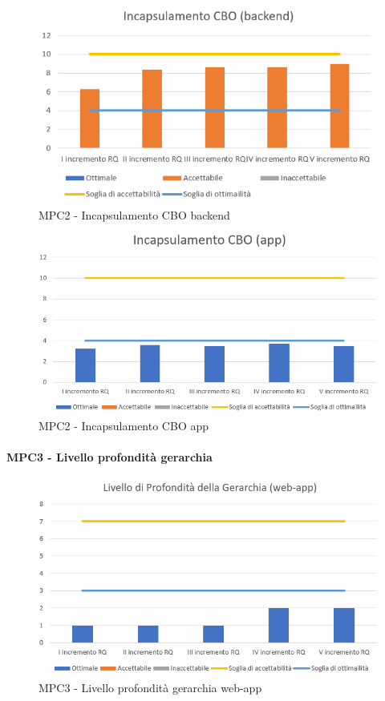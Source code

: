   \begin{figure}[h!]
    \centering
      \includegraphics[scale=1]{Immagini/CBO BE.PNG}
    \caption{MPC2 - Incapsulamento CBO backend}
  \end{figure}

  \begin{figure}[h!]
    \centering
      \includegraphics[scale=1]{Immagini/CBO APP.PNG}
    \caption{MPC2 - Incapsulamento CBO app}
  \end{figure}


  \newpage
  \paragraph{MPC3 - Livello profondità gerarchia}
  \begin{figure}[h!]
    \centering
      \includegraphics[scale=1]{Immagini/LivProGer WA.PNG}
    \caption{MPC3 - Livello profondità gerarchia web-app}
  \end{figure}

